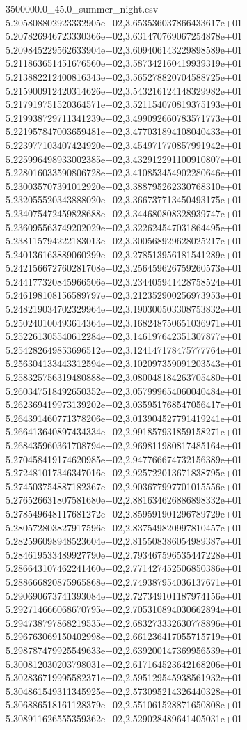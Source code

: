 \begin{filecontents*}{3500000.0_45.0_summer_night.csv}
5.205808802923332905e+02,3.653536037866433617e+01
5.207826946723330366e+02,3.631470769067254878e+01
5.209845229562633904e+02,3.609406143229898589e+01
5.211863651451676560e+02,3.587342160419939319e+01
5.213882212400816343e+02,3.565278820704588725e+01
5.215900912420314626e+02,3.543216124148329982e+01
5.217919751520364571e+02,3.521154070819375193e+01
5.219938729711341239e+02,3.499092660783571773e+01
5.221957847003659481e+02,3.477031894108040433e+01
5.223977103407424920e+02,3.454971770857991942e+01
5.225996498933002385e+02,3.432912291100910807e+01
5.228016033590806728e+02,3.410853454902280646e+01
5.230035707391012920e+02,3.388795262330768310e+01
5.232055520343888020e+02,3.366737713450493175e+01
5.234075472459828688e+02,3.344680808328939747e+01
5.236095563749202029e+02,3.322624547031864495e+01
5.238115794222183013e+02,3.300568929628025217e+01
5.240136163889060299e+02,3.278513956181541289e+01
5.242156672760281708e+02,3.256459626759260573e+01
5.244177320845966506e+02,3.234405941428758524e+01
5.246198108156589797e+02,3.212352900256973953e+01
5.248219034702329964e+02,3.190300503308753832e+01
5.250240100493614364e+02,3.168248750651036971e+01
5.252261305540612284e+02,3.146197642351307877e+01
5.254282649853696512e+02,3.124147178475777764e+01
5.256304133443312594e+02,3.102097359091203543e+01
5.258325756319480888e+02,3.080048184263705480e+01
5.260347518492650352e+02,3.057999654060040484e+01
5.262369419973139202e+02,3.035951768547056417e+01
5.264391460771378206e+02,3.013904527791419241e+01
5.266413640897434334e+02,2.991857931859158271e+01
5.268435960361708794e+02,2.969811980817485164e+01
5.270458419174620985e+02,2.947766674732156389e+01
5.272481017346347016e+02,2.925722013671838795e+01
5.274503754887182367e+02,2.903677997701015556e+01
5.276526631807581680e+02,2.881634626886898332e+01
5.278549648117681272e+02,2.859591901296789729e+01
5.280572803827917596e+02,2.837549820997810457e+01
5.282596098948523604e+02,2.815508386054989387e+01
5.284619533489927790e+02,2.793467596535447228e+01
5.286643107462241460e+02,2.771427452506850386e+01
5.288666820875965868e+02,2.749387954036137671e+01
5.290690673741393084e+02,2.727349101187974156e+01
5.292714666068670795e+02,2.705310894030662894e+01
5.294738797868219535e+02,2.683273332630778896e+01
5.296763069150402998e+02,2.661236417055715719e+01
5.298787479925549633e+02,2.639200147369956539e+01
5.300812030203798031e+02,2.617164523642168206e+01
5.302836719995582371e+02,2.595129545938561932e+01
5.304861549311345925e+02,2.573095214326440328e+01
5.306886518161128379e+02,2.551061528871650808e+01
5.308911626555359362e+02,2.529028489641405031e+01

\end{filecontents*}
